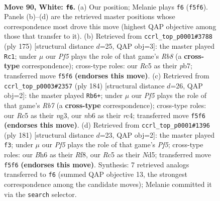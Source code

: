 \documentclass[11pt]{article}
\begin{document}
\clearpage

\begin{figure}[p]\centering
\begin{subfigure}{0.46\textwidth}\centering
\resizebox{\linewidth}{!}{%
\newchessgame
\chessboard[
  setfen={7k/3r4/1n5B/2R2P2/p6P/P7/7K/8 w - - 1 90},
  showmover=false,
  pgfstyle=straightmove, color=movearrow, markmove={f5-f6}
]}
\caption{}
\end{subfigure}\hfill
\begin{subfigure}{0.46\textwidth}\centering
\resizebox{\linewidth}{!}{%
\newchessgame
\chessboard[
  setfen={8/1P3k2/2K5/2N3pp/8/3R3P/7b/1r6 b - - 3 88},
  showmover=false,
  pgfstyle=straightmove, color=movearrow, markmove={b1-c1}
]}
\caption{}
\end{subfigure}
\\[4pt]
\begin{subfigure}{0.46\textwidth}\centering
\resizebox{\linewidth}{!}{%
\newchessgame
\chessboard[
  setfen={8/1R6/3kp1B1/7p/2r2P1P/6n1/P2K4/8 w - - 3 93},
  showmover=false,
  pgfstyle=straightmove, color=movearrow, markmove={b7-b6}
]}
\caption{}
\end{subfigure}\hfill
\begin{subfigure}{0.46\textwidth}\centering
\resizebox{\linewidth}{!}{%
\newchessgame
\chessboard[
  setfen={5r2/8/8/p2n4/P2N1pK1/1P6/7R/5k2 b - - 41 91},
  showmover=false,
  pgfstyle=straightmove, color=movearrow, markmove={f4-f3}
]}
\caption{}
\end{subfigure}
\caption{\textbf{Move 90, White: \texttt{f6}.} (a) Our position; Melanie plays \texttt{f6} (\texttt{f5f6}). Panels (b)--(d) are the retrieved master positions whose correspondence most drove this move (highest QAP objective among those that transfer to it). (b) Retrieved from \texttt{ccrl\_top\_p0001\#3788} (ply 175) [structural distance $d$=25, QAP obj=3]: the master played \texttt{Rc1}; under $\mu$ our \emph{Pf5} plays the role of that game's \emph{Rb8} (a \textbf{cross-type} correspondence); cross-type roles: our \emph{R}c5 as their \emph{p}b7; transferred move \texttt{f5f6} \textbf{(endorses this move)}. (c) Retrieved from \texttt{ccrl\_top\_p0003\#2357} (ply 184) [structural distance $d$=26, QAP obj=2]: the master played \texttt{Rb6+}; under $\mu$ our \emph{Pf5} plays the role of that game's \emph{Rb7} (a \textbf{cross-type} correspondence); cross-type roles: our \emph{R}c5 as their \emph{n}g3, our \emph{n}b6 as their \emph{r}c4; transferred move \texttt{f5f6} \textbf{(endorses this move)}. (d) Retrieved from \texttt{ccrl\_top\_p0001\#1396} (ply 181) [structural distance $d$=23, QAP obj=2]: the master played \texttt{f3}; under $\mu$ our \emph{Pf5} plays the role of that game's \emph{Pf5}; cross-type roles: our \emph{B}h6 as their \emph{R}f8, our \emph{R}c5 as their \emph{N}d5; transferred move \texttt{f5f6} \textbf{(endorses this move)}. Synthesis: 7 retrieved analogs transferred to \texttt{f6} (summed QAP objective 13, the strongest correspondence among the candidate moves); Melanie committed it via the \texttt{search} selector.}
\label{fig:thought-m178}
\end{figure}
\end{document}
